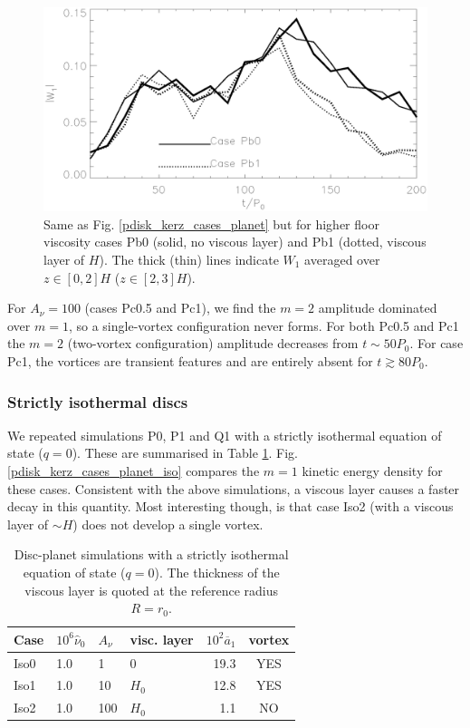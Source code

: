 \begin{figure}
  \centering
  \includegraphics[width=\linewidth]{figures/pdisk_kerz_cases_nu6}
  \caption{Same as Fig. \ref{pdisk_kerz_cases_planet} but for higher
    floor viscosity cases Pb0 (solid, no viscous layer) and Pb1
    (dotted, viscous layer of $H$). The thick (thin) lines indicate
    $W_1$ averaged over $z\in[0,2]H$
    ($z\in[2,3]H$). 
    \label{pdisk_kerz_cases_planet_hivisc}}
\end{figure}


For $A_\nu=100$ (cases Pc0.5 and Pc1), we find the $m=2$ amplitude
dominated over $m=1$, so a single-vortex configuration never
forms. For both Pc0.5 and Pc1 the $m=2$ (two-vortex configuration)
amplitude decreases from $t\sim 50P_0$. For case Pc1, the vortices are
transient features and are entirely absent for $t\gtrsim80P_0$.  


\subsubsection{Strictly isothermal discs} 
We repeated simulations P0, P1 and Q1 with a strictly isothermal
equation of state ($q=0$). These are summarised in Table
\ref{planet_sims_iso}. Fig. \ref{pdisk_kerz_cases_planet_iso} compares
the $m=1$ kinetic energy density for these cases. Consistent with the
above simulations, a viscous layer causes a faster decay in this
quantity. Most interesting though, is that case Iso2 (with a viscous
layer of $\sim H$) does not develop a single vortex. 

\begin{table}
  \centering
  \caption{Disc-planet simulations with a strictly
    isothermal equation of state ($q=0$). The thickness of the viscous layer
    is quoted at the reference radius $R=r_0$. \label{planet_sims_iso}}
    \begin{tabular}{llllrc}
      \hline\hline
      Case & $10^6\hat{\nu}_0$ & $A_\nu$ & visc. layer& $10^2\overline{a}_1$ &vortex \\ 
      \hline
      Iso0   & 1.0  & 1          & 0      & 19.3  &  YES   \\
      Iso1   & 1.0  & 10         & $H_0$  & 12.8  &  YES     \\ 
      Iso2   & 1.0  & 100        & $H_0$  & 1.1  &  NO     \\ 
      \hline
  \end{tabular}
\end{table}

